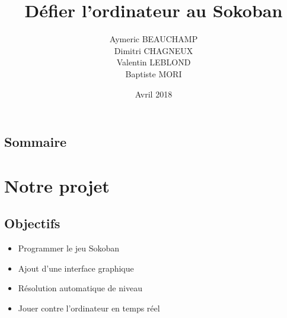 \documentclass{beamer}
\title{Défier l'ordinateur au Sokoban}
\author{Aymeric BEAUCHAMP\\Dimitri CHAGNEUX\\Valentin LEBLOND\\Baptiste MORI}
\date{Avril 2018}
\begin{document}
 
\maketitle 
\section*{}
\subsection*{Sommaire}
\frame{\tableofcontents}

\section{Notre projet}

\subsection{Objectifs}
\begin{frame}
\begin{itemize}
\item Programmer le jeu Sokoban
\item Ajout d'une interface graphique
\item Résolution automatique de niveau
\item Jouer contre l'ordinateur en temps réel
\end{itemize}
\end{frame}
\end{document}
